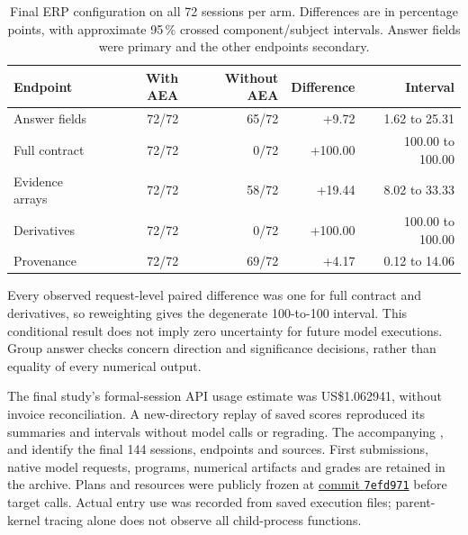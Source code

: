 \begin{table}[!htbp]
\centering\small
\caption{Final ERP configuration on all 72 sessions per arm. Differences are in percentage points, with approximate 95\,\% crossed component/subject intervals. Answer fields were primary and the other endpoints secondary.}
\label{tab:erp-paired-configurations}
\begin{tabular}{lrrrr}
\toprule
Endpoint & With AEA & Without AEA & Difference & Interval \\
\midrule
Answer fields & 72/72 & 65/72 & +9.72 & 1.62 to 25.31 \\
Full contract & 72/72 & 0/72 & +100.00 & 100.00 to 100.00 \\
Evidence arrays & 72/72 & 58/72 & +19.44 & 8.02 to 33.33 \\
Derivatives & 72/72 & 0/72 & +100.00 & 100.00 to 100.00 \\
Provenance & 72/72 & 69/72 & +4.17 & 0.12 to 14.06 \\
\bottomrule
\end{tabular}
\par\smallskip
\begin{minipage}{\linewidth}\footnotesize
Every observed request-level paired difference was one for full contract and derivatives, so reweighting gives the degenerate 100-to-100 interval. This conditional result does not imply zero uncertainty for future model executions. Group answer checks concern direction and significance decisions, rather than equality of every numerical output.
\end{minipage}
\end{table}

The final study's formal-session API usage estimate was US\$1.062941, without invoice reconciliation. A new-directory replay of saved scores reproduced its summaries and intervals without model calls or regrading. The accompanying ,  and  identify the final 144 sessions, endpoints and sources. First submissions, native model requests, programs, numerical artifacts and grades are retained in the archive. Plans and resources were publicly frozen at \href{https://github.com/dengzhe-hou/auto-eeg-analysis/tree/7efd971ecc0bc3610ab535894c54fc79f93d6daa/evaluation/erp-entry-20261106}{commit \texttt{7efd971}} before target calls. Actual entry use was recorded from saved execution files; parent-kernel tracing alone does not observe all child-process functions.

